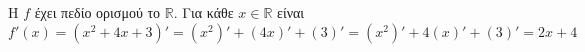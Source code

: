 \begin{alist}
\item Η $ f $ έχει πεδίο ορισμού το $ \mathbb{R} $. Για κάθε $ x\in\mathbb{R} $ είναι
\[ f'(x)=\left(x^2+4x+3\right)'=(x^2)'+(4x)'+(3)'=(x^2)'+4(x)'+(3)'=2x+4 \]

\end{alist}
